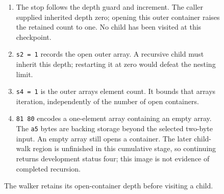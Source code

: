 \begin{figure}[htbp]
  \par\smallskip
  \begin{minipage}{\linewidth}
    \small
    \begin{enumerate}
      \setlength{\itemsep}{0pt}
            \setlength{\parsep}{0pt}
      \item The stop follows the depth guard and increment. The caller supplied inherited depth zero; opening this outer container raises the retained count to one. No child has been visited at this checkpoint.
      \item \texttt{s2 = 1} records the open outer array. A recursive child must inherit this depth; restarting it at zero would defeat the nesting limit.
      \item \texttt{s4 = 1} is the outer array\textquotesingle s element count. It bounds that array\textquotesingle s iteration, independently of the number of open containers.
      \item \texttt{81 80} encodes a one-element array containing an empty array. The \texttt{a5} bytes are backing storage beyond the selected two-byte input. An empty array still opens a container. The later child-walk region is unfinished in this cumulative stage, so continuing returns development status four; this image is not evidence of completed recursion.
    \end{enumerate}
  \end{minipage}
  \caption{The walker retains its open-container depth before visiting a child.}
  \label{capture:032-cbor-telemetry-inherited-depth}
  \label{cbor-inherited-depth}
\end{figure}
\par
